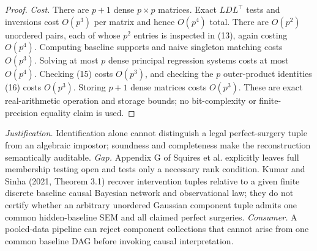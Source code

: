 \documentclass{article}
\begin{document}
\begin{proof}
\emph{Cost.}
There are \(p+1\) dense \(p\times p\) matrices.  Exact
\(LDL^{\top}\) tests and inversions cost \(O(p^3)\) per matrix and hence
\(O(p^4)\) total.  There are \(O(p^2)\) unordered pairs, each of whose
\(p^2\) entries is inspected in (13), again costing \(O(p^4)\).
Computing baseline supports and naive singleton matching costs \(O(p^3)\).
Solving at most \(p\) dense principal regression systems costs at most
\(O(p^4)\).  Checking (15) costs \(O(p^3)\), and checking the \(p\)
outer-product identities (16) costs \(O(p^3)\).  Storing \(p+1\) dense
matrices costs \(O(p^3)\).  These are exact real-arithmetic operation and
storage bounds; no bit-complexity or finite-precision equality claim is
used.
\end{proof}
\par\smallskip\noindent \textit{Justification.} Identification alone cannot distinguish a legal perfect-surgery tuple from an algebraic impostor; soundness and completeness make the reconstruction semantically auditable. \textit{Gap.} Appendix G of Squires et al. explicitly leaves full membership testing open and tests only a necessary rank condition. Kumar and Sinha (2021, Theorem 3.1) recover intervention tuples relative to a given finite discrete baseline causal Bayesian network and observational law; they do not certify whether an arbitrary unordered Gaussian component tuple admits one common hidden-baseline SEM and all claimed perfect surgeries. \textit{Consumer.} A pooled-data pipeline can reject component collections that cannot arise from one common baseline DAG before invoking causal interpretation.
\end{document}
